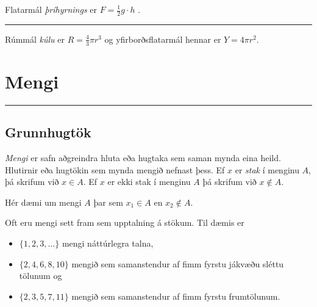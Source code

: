 \documentclass[a4paper,10pt,icelandic]{sphinxmanual}
\begin{document}
Flatarmál \textit{þríhyrnings} er \(F=\frac{1}{2}g\cdot h\) .

\begin{figure}[htbp]
\centering

\noindent{}
\end{figure}


\bigskip\hrule\bigskip


Rúmmál \textit{kúlu} er \(R=\frac{4}{3}\pi r^3\) og yfirborðsflatarmál hennar er \(Y=4\pi r^2\).

\begin{figure}[htbp]
\centering

\noindent{}
\end{figure}


\chapter{Mengi}
\label{\detokenize{Kafli04:mengi}}\label{\detokenize{Kafli04::doc}}\label{\detokenize{Kafli04:s-mengi}}

\bigskip\hrule\bigskip



\section{Grunnhugtök}
\label{\detokenize{Kafli04:grunnhugtok}}
\textit{Mengi} er safn aðgreindra hluta eða hugtaka sem saman mynda eina heild. Hlutirnir eða
hugtökin sem mynda mengið nefnast  þess. Ef \(x\) er \textit{stak} í menginu \(A\), þá skrifum við
\(x \in A\). Ef \(x\) er ekki stak í menginu \(A\) þá skrifum við \(x \notin A\).


Hér dæmi um mengi \(A\) þar sem \(x_1 \in A\) en \(x_2 \notin A\).

Oft eru mengi sett fram sem upptalning á stökum. Til dæmis er
\begin{itemize}
\item {} 
\(\{1,2,3,\dots\}\) mengi náttúrlegra talna,

\item {} 
\(\{2,4,6,8,10\}\) mengið sem samanstendur af fimm fyrstu jákvæðu sléttu tölunum og

\item {} 
\(\{2,3,5,7,11\}\) mengið sem samanstendur af fimm fyrstu frumtölunum.

\end{itemize}
\end{document}

